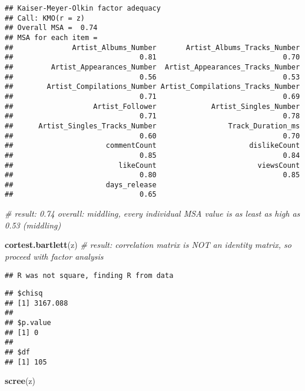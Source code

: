 \documentclass[
]{article}
\newenvironment{Shaded}{\begin{snugshade}}{\end{snugshade}}
\newcommand{\CommentTok}[1]{\textcolor[rgb]{0.56,0.35,0.01}{\textit{#1}}}
\newcommand{\KeywordTok}[1]{\textcolor[rgb]{0.13,0.29,0.53}{\textbf{#1}}}
\newcommand{\NormalTok}[1]{#1}
\begin{document}
\begin{verbatim}
## Kaiser-Meyer-Olkin factor adequacy
## Call: KMO(r = z)
## Overall MSA =  0.74
## MSA for each item = 
##              Artist_Albums_Number       Artist_Albums_Tracks_Number 
##                              0.81                              0.70 
##         Artist_Appearances_Number  Artist_Appearances_Tracks_Number 
##                              0.56                              0.53 
##        Artist_Compilations_Number Artist_Compilations_Tracks_Number 
##                              0.71                              0.69 
##                   Artist_Follower             Artist_Singles_Number 
##                              0.71                              0.78 
##      Artist_Singles_Tracks_Number                 Track_Duration_ms 
##                              0.60                              0.70 
##                      commentCount                      dislikeCount 
##                              0.85                              0.84 
##                         likeCount                        viewsCount 
##                              0.80                              0.85 
##                      days_release 
##                              0.65
\end{verbatim}

\begin{Shaded}
\begin{Highlighting}[]
\CommentTok{# result: 0.74 overall: middling, every individual MSA value is as least as high as 0.53 (middling)}

\KeywordTok{cortest.bartlett}\NormalTok{(z) }\CommentTok{# result: correlation matrix is NOT an identity matrix, so proceed with factor analysis}
\end{Highlighting}
\end{Shaded}

\begin{verbatim}
## R was not square, finding R from data
\end{verbatim}

\begin{verbatim}
## $chisq
## [1] 3167.088
## 
## $p.value
## [1] 0
## 
## $df
## [1] 105
\end{verbatim}

\begin{Shaded}
\begin{Highlighting}[]
\KeywordTok{scree}\NormalTok{(z)}
\end{Highlighting}
\end{Shaded}
\end{document}
